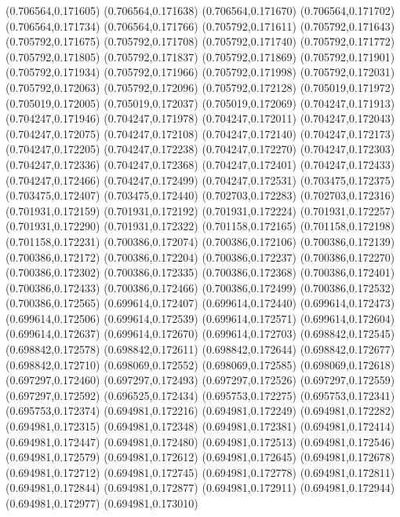 (0.706564,0.171605)
(0.706564,0.171638)
(0.706564,0.171670)
(0.706564,0.171702)
(0.706564,0.171734)
(0.706564,0.171766)
(0.705792,0.171611)
(0.705792,0.171643)
(0.705792,0.171675)
(0.705792,0.171708)
(0.705792,0.171740)
(0.705792,0.171772)
(0.705792,0.171805)
(0.705792,0.171837)
(0.705792,0.171869)
(0.705792,0.171901)
(0.705792,0.171934)
(0.705792,0.171966)
(0.705792,0.171998)
(0.705792,0.172031)
(0.705792,0.172063)
(0.705792,0.172096)
(0.705792,0.172128)
(0.705019,0.171972)
(0.705019,0.172005)
(0.705019,0.172037)
(0.705019,0.172069)
(0.704247,0.171913)
(0.704247,0.171946)
(0.704247,0.171978)
(0.704247,0.172011)
(0.704247,0.172043)
(0.704247,0.172075)
(0.704247,0.172108)
(0.704247,0.172140)
(0.704247,0.172173)
(0.704247,0.172205)
(0.704247,0.172238)
(0.704247,0.172270)
(0.704247,0.172303)
(0.704247,0.172336)
(0.704247,0.172368)
(0.704247,0.172401)
(0.704247,0.172433)
(0.704247,0.172466)
(0.704247,0.172499)
(0.704247,0.172531)
(0.703475,0.172375)
(0.703475,0.172407)
(0.703475,0.172440)
(0.702703,0.172283)
(0.702703,0.172316)
(0.701931,0.172159)
(0.701931,0.172192)
(0.701931,0.172224)
(0.701931,0.172257)
(0.701931,0.172290)
(0.701931,0.172322)
(0.701158,0.172165)
(0.701158,0.172198)
(0.701158,0.172231)
(0.700386,0.172074)
(0.700386,0.172106)
(0.700386,0.172139)
(0.700386,0.172172)
(0.700386,0.172204)
(0.700386,0.172237)
(0.700386,0.172270)
(0.700386,0.172302)
(0.700386,0.172335)
(0.700386,0.172368)
(0.700386,0.172401)
(0.700386,0.172433)
(0.700386,0.172466)
(0.700386,0.172499)
(0.700386,0.172532)
(0.700386,0.172565)
(0.699614,0.172407)
(0.699614,0.172440)
(0.699614,0.172473)
(0.699614,0.172506)
(0.699614,0.172539)
(0.699614,0.172571)
(0.699614,0.172604)
(0.699614,0.172637)
(0.699614,0.172670)
(0.699614,0.172703)
(0.698842,0.172545)
(0.698842,0.172578)
(0.698842,0.172611)
(0.698842,0.172644)
(0.698842,0.172677)
(0.698842,0.172710)
(0.698069,0.172552)
(0.698069,0.172585)
(0.698069,0.172618)
(0.697297,0.172460)
(0.697297,0.172493)
(0.697297,0.172526)
(0.697297,0.172559)
(0.697297,0.172592)
(0.696525,0.172434)
(0.695753,0.172275)
(0.695753,0.172341)
(0.695753,0.172374)
(0.694981,0.172216)
(0.694981,0.172249)
(0.694981,0.172282)
(0.694981,0.172315)
(0.694981,0.172348)
(0.694981,0.172381)
(0.694981,0.172414)
(0.694981,0.172447)
(0.694981,0.172480)
(0.694981,0.172513)
(0.694981,0.172546)
(0.694981,0.172579)
(0.694981,0.172612)
(0.694981,0.172645)
(0.694981,0.172678)
(0.694981,0.172712)
(0.694981,0.172745)
(0.694981,0.172778)
(0.694981,0.172811)
(0.694981,0.172844)
(0.694981,0.172877)
(0.694981,0.172911)
(0.694981,0.172944)
(0.694981,0.172977)
(0.694981,0.173010)

